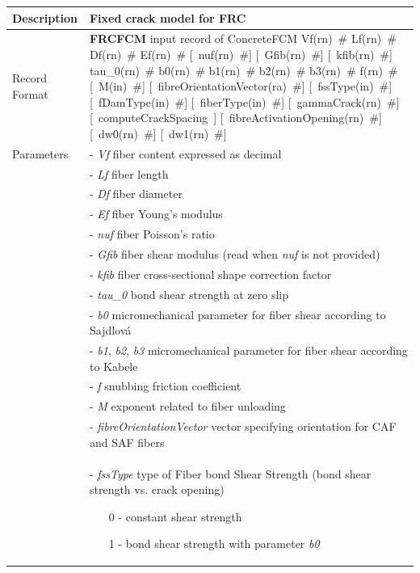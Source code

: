 \documentclass[a4paper]{article}
\newcommand{\descitem}[1]{{\noindent \bf #1}}
\newcommand{\elemparam}[2]{{{#1\tiny (#2)}~\#}}
\newcommand{\optelemparam}[2]{[{~\elemparam{#1}{#2}}]}
\newcommand{\elemstring}[1]{{#1}}
\newcommand{\optelemstring}[1]{[{~\elemstring{#1}~}]}
\newcommand{\param}[1]{{\it #1}}
\begin{document}
\begin{longtable}{|l|p{9cm}|}
\hline
Description & Fixed crack model for FRC\\
\hline
Record Format & \descitem{FRCFCM} input record of ConcreteFCM
\elemparam{Vf}{rn}
\elemparam{Lf}{rn}
\elemparam{Df}{rn}
\elemparam{Ef}{rn}
\optelemparam{nuf}{rn}
\optelemparam{Gfib}{rn}
\optelemparam{kfib}{rn}
\elemparam{tau\_0}{rn}
\elemparam{b0}{rn}
\elemparam{b1}{rn}
\elemparam{b2}{rn}
\elemparam{b3}{rn}
\elemparam{f}{rn}
\optelemparam{M}{in}
\optelemparam{fibreOrientationVector}{ra}
\optelemparam{fssType}{in}
\optelemparam{fDamType}{in}
\optelemparam{fiberType}{in}
\optelemparam{gammaCrack}{rn}
\optelemstring{computeCrackSpacing}
\optelemparam{fibreActivationOpening}{rn}
\optelemparam{dw0}{rn}
\optelemparam{dw1}{rn}
\\
Parameters &- \param{Vf} fiber content expressed as decimal\\
&- \param{Lf} fiber length\\
&- \param{Df} fiber diameter\\
&- \param{Ef} fiber Young's modulus\\
&- \param{nuf} fiber Poisson's ratio\\
&- \param{Gfib} fiber shear modulus (read when \param{nuf} is not provided)\\
&- \param{kfib} fiber cross-sectional shape correction factor\\
&- \param{tau\_0} bond shear strength at zero slip\\
&- \param{b0} micromechanical parameter for fiber shear according to Sajdlová\\
&- \param{b1}, \param{b2}, \param{b3} micromechanical parameter for fiber shear according to Kabele\\
&- \param{f} snubbing friction coefficient\\
&- \param{M} exponent related to fiber unloading\\
&- \param{fibreOrientationVector} vector specifying orientation for CAF and SAF fibers\\
&- \param{fssType} type of Fiber bond Shear Strength (bond shear strength vs. crack opening)
\begin{itemize}\setlength{\itemsep}{-3pt}
\item[0 -] constant shear strength
\item[1 -] bond shear strength with parameter \param{b0}

\end{itemize}
\end{longtable}
\end{document}

